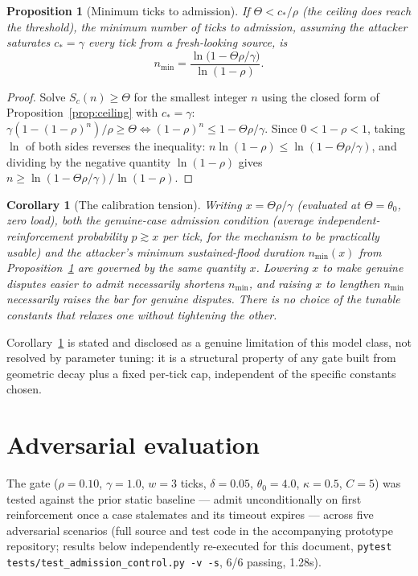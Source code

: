 \documentclass[11pt]{article}
\newtheorem{proposition}{Proposition}
\newtheorem{corollary}{Corollary}
\begin{document}
\begin{proposition}[Minimum ticks to admission]
\label{prop:minticks}
If $\Theta < c_{\ast}/\rho$ (the ceiling does reach the threshold), the minimum number
of ticks to admission, assuming the attacker saturates $c_{\ast}=\gamma$ every tick
from a fresh-looking source, is
\[
n_{\min} = \frac{\ln\!\big(1 - \Theta\rho/\gamma\big)}{\ln(1-\rho)}.
\]
\end{proposition}
\begin{proof}
Solve $S_c(n) \geq \Theta$ for the smallest integer $n$ using the closed form of
Proposition~\ref{prop:ceiling} with $c_{\ast}=\gamma$:
$\gamma(1-(1-\rho)^n)/\rho \geq \Theta \iff (1-\rho)^n \leq 1-\Theta\rho/\gamma$. Since
$0<1-\rho<1$, taking $\ln$ of both sides reverses the inequality:
$n\ln(1-\rho) \leq \ln(1-\Theta\rho/\gamma)$, and dividing by the negative quantity
$\ln(1-\rho)$ gives $n \geq \ln(1-\Theta\rho/\gamma)/\ln(1-\rho)$.
\end{proof}

\begin{corollary}[The calibration tension]
\label{cor:tension}
Writing $x = \Theta\rho/\gamma$ (evaluated at $\Theta=\theta_0$, zero load), both the
genuine-case admission condition (average independent-reinforcement probability
$p \gtrsim x$ per tick, for the mechanism to be practically usable) and the attacker's
minimum sustained-flood duration $n_{\min}(x)$ from Proposition~\ref{prop:minticks} are
governed by the same quantity $x$. Lowering $x$ to make genuine disputes easier to
admit necessarily shortens $n_{\min}$, and raising $x$ to lengthen $n_{\min}$
necessarily raises the bar for genuine disputes. There is no choice of the tunable
constants that relaxes one without tightening the other.
\end{corollary}

Corollary~\ref{cor:tension} is stated and disclosed as a genuine limitation of this
model class, not resolved by parameter tuning: it is a structural property of any
gate built from geometric decay plus a fixed per-tick cap, independent of the specific
constants chosen.

\section{Adversarial evaluation}
\label{sec:eval}

The gate ($\rho=0.10$, $\gamma=1.0$, $w=3$ ticks, $\delta=0.05$, $\theta_0=4.0$,
$\kappa=0.5$, $C=5$) was tested against the prior static baseline --- admit
unconditionally on first reinforcement once a case stalemates and its timeout expires
--- across five adversarial scenarios (full source and test code in the accompanying
prototype repository; results below independently re-executed for this document,
\texttt{pytest tests/test\_admission\_control.py -v -s}, 6/6 passing, 1.28s).
\end{document}
